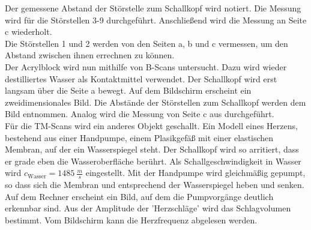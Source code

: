 Der gemessene Abstand der Störstelle zum Schallkopf wird notiert.
Die Messung wird für die Störstellen 3-9 durchgeführt.
Anschließend wird die Messung an Seite c wiederholt.
\\Die Störstellen 1 und 2 werden von den Seiten a, b und c vermessen, um den Abstand zwischen ihnen errechnen zu können.
\\Der Acrylblock wird nun mithilfe von B-Scans untersucht.
Dazu wird wieder destilliertes Wasser als Kontaktmittel verwendet.
Der Schallkopf wird erst langsam über die Seite a bewegt.
Auf dem Bildschirm erscheint ein zweidimensionales Bild.
Die Abstände der Störstellen zum Schallkopf werden dem Bild entnommen.
Analog wird die Messung von Seite c aus durchgeführt.
\\Für die TM-Scans wird ein anderes Objekt geschallt.
Ein Modell eines Herzens, bestehend aus einer Handpumpe, einem Plasikgefäß mit einer elastischen Membran, auf der ein Wasserspiegel steht.
Der Schallkopf wird so arritiert, dass er grade eben die Wasseroberfläche berührt.
Als Schallgeschwindigkeit in Wasser wird $c_{\text{Wasser}}=\SI{1485}{\frac{m}{s}}$ \cite{acryl} eingestellt.
Mit der Handpumpe wird gleichmäßig gepumpt, so dass sich die Membran und entsprechend der Wasserspiegel heben und senken.
Auf dem Rechner erscheint ein Bild, auf dem die Pumpvorgänge deutlich erkennbar sind.
Aus der Amplitude der 'Herzschläge' wird das Schlagvolumen bestimmt.
Vom Bildschirm kann die Herzfrequenz abgelesen werden.
